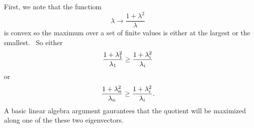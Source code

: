 \documentclass[12pt,letterpaper]{amsart}%
\numberwithin{mycounter}{section}
\theoremstyle{plain}
\numberwithin{equation}{section}
\theoremstyle{definition}
\begin{document}
First, we note that the functiom 
\begin{equation*}
\lambda \rightarrow \frac{1+\lambda ^{2}}{\lambda }
\end{equation*}%
is convex so the maximum over a set of finite values is either at the largest or
the smallest. \ So either 
\begin{equation*}
\frac{1+\lambda _{1}^{2}}{\lambda _{1}}\geq \frac{1+\lambda _{i}^{2}}{%
\lambda _{i}}
\end{equation*}%
or 
\begin{equation*}
\frac{1+\lambda _{n}^{2}}{\lambda _{n}}\geq \frac{1+\lambda _{i}^{2}}{%
\lambda _{i}}.
\end{equation*}
A basic linear algebra argument gaurantees that the quotient will be maximized along one of the these two eigenvectors.  

\end{document}
